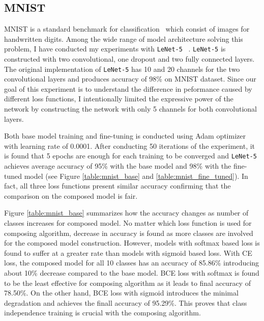 \documentclass{article}
\begin{document}

\subsection{MNIST}

MNIST is a standard benchmark for classification~\cite{lecun1998gradient} which consist of images for handwritten digits. Among the wide range of model architecture solving this problem, I have conducted my experiments with \texttt{LeNet-5} ~\cite{lecun2015lenet}. \texttt{LeNet-5} is constructed with two convolutional, one dropout and two fully connected layers. The original implementation of \texttt{LeNet-5} has 10 and 20 channels for the two convolutional layers and produces accuracy of 98\% on MNIST dataset. Since our goal of this experiment is to understand the difference in peformance caused by different loss functions, I intentionally limited the expressive power of the network by constructing the network with only 5 channels for both convolutional layers.

Both base model training and fine-tuning is conducted using Adam optimizer with learning rate of 0.0001. After conducting 50 iterations of the experiment, it is found that 5 epochs are enough for each training to be converged and \texttt{LeNet-5} achieves average accuracy of 95\% with the base model and 98\% with the fine-tuned model (see Figure \ref{table:mnist_base} and \ref{table:mnist_fine_tuned}). In fact, all three loss functions present similar accuracy confirming that the comparison on the composed model is fair.

Figure \ref{table:mnist_base} summarizes how the accuracy changes as number of classes increases for composed model. No matter which loss function is used for composing algorithm, decrease in accuracy is found as more classes are involved for the composed model construction. However, models with softmax based loss is found to suffer at a greater rate than models with sigmoid based loss. With CE loss, the composed model for all 10 classes has an accuracy of 85.86\% introducing about 10\% decrease compared to the base model. BCE loss with softmax is found to be the least effective for composing algorithm as it leads to final accuracy of 78.50\%. On the other hand, BCE loss with sigmoid introduces the minimal degradation and achieves the finall accuracy of 95.29\%. This proves that class independence training is crucial with the composing algorithm.
\end{document}
